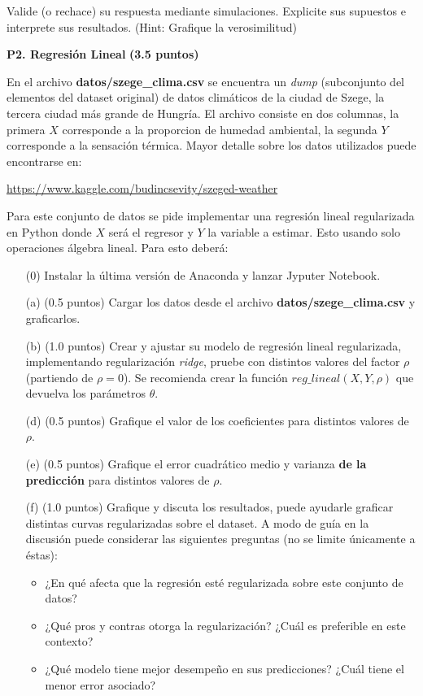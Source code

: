 \documentclass[11pt,letterpaper]{article}
\begin{document}
Valide (o rechace) su respuesta mediante simulaciones. Explicite sus supuestos e interprete sus resultados. (Hint: Grafique la verosimilitud)


\vspace{5 mm}
\noindent\textbf{P2. Regresión Lineal} \textbf{(3.5 puntos)}
\vspace{5 mm}

En el archivo \textbf{datos/szege\_clima.csv} se encuentra un \emph{dump} (subconjunto del  elementos del dataset original) de datos climáticos de la ciudad de Szege, la tercera ciudad más grande de Hungría. El archivo consiste en dos columnas, la primera $X$ corresponde a la proporcion de humedad ambiental, la segunda $Y$ corresponde a la sensación térmica. Mayor detalle sobre los datos utilizados puede encontrarse en:

\vspace{1em}
\centerline{\url{https://www.kaggle.com/budincsevity/szeged-weather}}
\vspace{1em}

Para este conjunto de datos se pide implementar una regresión lineal regularizada en Python donde $X$ será el regresor y $Y$ la variable a estimar. Esto usando solo operaciones álgebra lineal.
Para esto deberá:
\begin{itemize}
	\item[(0)] Instalar la última versión de Anaconda y lanzar Jyputer Notebook.
	\item[(a)] (0.5 puntos) Cargar los datos desde el archivo \textbf{datos/szege\_clima.csv} y graficarlos.
	\item[(b)] (1.0 puntos) Crear y ajustar su modelo de regresión lineal regularizada, implementando regularización \emph{ridge}, pruebe con distintos valores del factor $\rho$ (partiendo de $\rho=0$). Se recomienda crear la función $reg\_lineal(X,Y,\rho)$ que devuelva los parámetros $\theta$.
	\item[(d)] (0.5 puntos) Grafique el valor de los coeficientes para distintos valores de $\rho$.
	\item[(e)] (0.5 puntos) Grafique el error cuadrático medio y varianza \textbf{de la predicción} para distintos valores de $\rho$.
	\item[(f)] (1.0 puntos) Grafique y discuta los resultados, puede ayudarle graficar distintas curvas regularizadas sobre el dataset. A modo de guía en la discusión puede considerar las siguientes preguntas (no se limite únicamente a éstas):
	    \begin{itemize}
	        \item ¿En qué afecta que la regresión esté regularizada sobre este conjunto de datos?
	        \item ¿Qué pros y contras otorga la regularización? ¿Cuál es preferible en este contexto?
	        \item ¿Qué modelo tiene mejor desempeño en sus predicciones? ¿Cuál tiene el menor error asociado?
	    \end{itemize}
\end{itemize}
\end{document}
